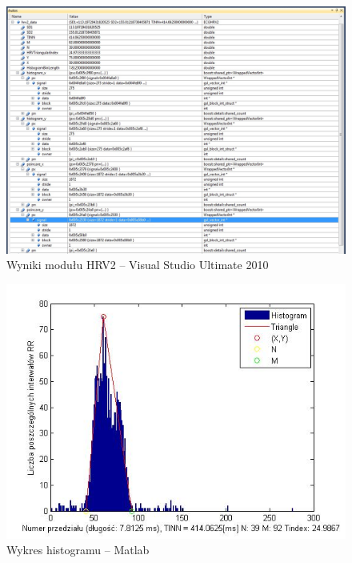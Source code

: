 \documentclass[a4paper, 11pt]{article}
\begin{document}
\begin{center}
%
\begin{figure}
\begin{centering}
\includegraphics[scale=0.4]{include/hrv2_1}
\par\end{centering}

\caption{Wyniki modułu HRV2 -- Visual Studio Ultimate 2010}
\label{fig:hrv2_1}
\end{figure}

\par\end{center}

\begin{center}
%
\begin{figure}
\begin{centering}
\includegraphics[scale=0.7]{include/hrv2_2}
\par\end{centering}

\caption{Wykres histogramu -- Matlab}
\label{fig:hrv2_2}
\end{figure}

\par\end{center}
\end{document}
